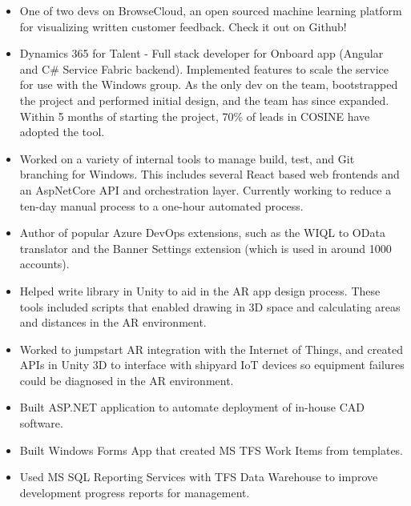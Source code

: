 \documentclass[10pt,a4paper]{altacv}
\begin{document}
\begin{itemize}
\item One of two devs on BrowseCloud, an open sourced machine learning platform for visualizing written customer feedback. Check it out on Github!
\item Dynamics 365 for Talent - Full stack developer for Onboard app (Angular and C\# Service Fabric backend). Implemented features to scale the service for use with the Windows group. As the only dev on the team, bootstrapped the project and performed initial design, and the team has since expanded. Within 5 months of starting the project, 70\% of leads in COSINE have adopted the tool.
\item Worked on a variety of internal tools to manage build, test, and Git branching for Windows. This includes several React based web frontends and an AspNetCore API and orchestration layer. Currently working to reduce a ten-day manual process to a one-hour automated process.
\item Author of popular Azure DevOps extensions, such as the WIQL to OData translator and the Banner Settings extension (which is used in around 1000 accounts).
\end{itemize}

\divider

\begin{itemize}
\item Helped write library in Unity to aid in the AR app design process. These tools included scripts that enabled drawing in 3D space and calculating areas and distances in the AR environment. 
\item Worked to jumpstart AR integration with the Internet of Things, and created APIs in Unity 3D to interface with shipyard IoT devices so equipment failures could be diagnosed in the AR environment.
\end{itemize}

\divider


\begin{itemize}
\item Built ASP.NET application to automate deployment of in-house CAD software.
\item Built Windows Forms App that created MS TFS Work Items from templates.
\item Used MS SQL Reporting Services with TFS Data Warehouse to improve development progress reports for management.
\end{itemize}
\end{document}
